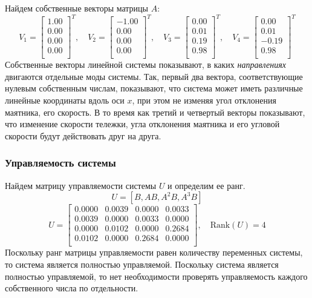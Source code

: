 Найдем собственные векторы матрицы $A$:
\begin{equation}
    V_1 = \begin{bmatrix}
    1.00  \\ 0.00  \\ 0.00 \\ 0.00 \\
    \end{bmatrix}^T,\quad
    V_2 = \begin{bmatrix}
    -1.00 \\ 0.00 \\ 0.00 \\ 0.00 \\
    \end{bmatrix}^T,\quad
    V_3 = \begin{bmatrix}
    0.00 \\ 0.01 \\ 0.19 \\ 0.98 \\
    \end{bmatrix}^T,\quad
    V_4 = \begin{bmatrix}
    0.00  \\ 0.01  \\ -0.19 \\ 0.98 \\
    \end{bmatrix}^T
    \label{eq:eigenvectors}
\end{equation}
Собственные векторы линейной системы показывают, в каких \textit{направлениях} двигаются отдельные моды системы. 
Так, первый два вектора, соответствующие нулевым собственным числам, показывают, что система может иметь различные
линейные координаты вдоль оси $x$, при этом не изменяя угол отклонения маятника, его скорость. В то время как третий и четвертый
векторы показывают, что изменение скорости тележки, угла отклонения маятника и его угловой скорости будут действовать 
друг на друга. 

\subsubsection{Управляемость системы}
Найдем матрицу управляемости системы $U$ и определим ее ранг. 
\begin{equation}
    U = [B, AB, A^2B, A^3B]
\end{equation}
\begin{equation}
    U = \begin{bmatrix}
    0.0000  & 0.0039  & 0.0000  & 0.0033 \\ 
    0.0039  & 0.0000  & 0.0033  & 0.0000 \\ 
    0.0000  & 0.0102  & 0.0000  & 0.2684 \\ 
    0.0102  & 0.0000  & 0.2684  & 0.0000 \\ 
    \end{bmatrix}, \quad \text{Rank}(U) = 4
    \label{eq:controlability_matrix}
\end{equation}
Поскольку ранг матрицы управляемости равен количеству переменных системы, то система является полностью управляемой. 
Поскольку система является полностью управляемой, то нет необходимости проверять управляемость каждого собственного 
числа по отдельности. 

